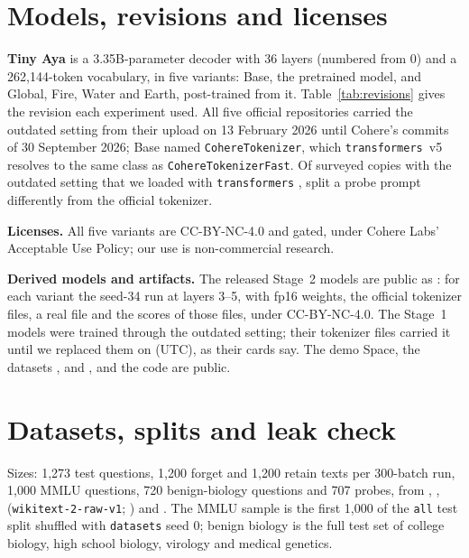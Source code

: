 

\section{Models, revisions and licenses}
\label{app:models}

\textbf{Tiny Aya} \citep{salamanca2026tinyaya} is a 3.35B-parameter decoder with 36 layers (numbered from 0) and a 262,144-token vocabulary, in five variants: Base, the pretrained model, and Global, Fire, Water and Earth, post-trained from it. Table~\ref{tab:revisions} gives the revision each experiment used. All five official repositories carried the outdated setting from their upload on 13 February 2026 until Cohere's commits of 30 September 2026; Base named \texttt{CohereTokenizer}, which \texttt{transformers}~v5 resolves to the same class as \texttt{CohereTokenizerFast}. Of \surveySampled{} surveyed copies with the outdated setting that we loaded with \texttt{transformers} \surveyTransformers, \surveySampledDiffer{} split a probe prompt differently from the official tokenizer.

\textbf{Licenses.} All five variants are CC-BY-NC-4.0 and gated, under Cohere Labs' Acceptable Use Policy; our use is non-commercial research.

\textbf{Derived models and artifacts.} The released Stage~2 models are public as : for each variant the seed-34 run at layers 3--5, with fp16 weights, the official tokenizer files, a real \qkm{} file and the scores of those files, under CC-BY-NC-4.0. The Stage~1 models  were trained through the outdated setting; their tokenizer files carried it until we replaced them on \fixDate{} (UTC), as their cards say. The demo Space, the datasets ,  and , and the code are public.

\section{Datasets, splits and leak check}
\label{app:data}

Sizes: 1,273 \wmdp{} test questions, 1,200 forget and 1,200 retain texts per 300-batch run, 1,000 MMLU questions, 720 benign-biology questions and 707 probes, from  \citep{li2024wmdp}, ,  (\texttt{wikitext-2-raw-v1}; \citealp{merity2016pointer}) and  \citep{hendrycks2021mmlu}. The MMLU sample is the first 1,000 of the \texttt{all} test split shuffled with \texttt{datasets} seed 0; benign biology is the full test set of college biology, high school biology, virology and medical genetics.


